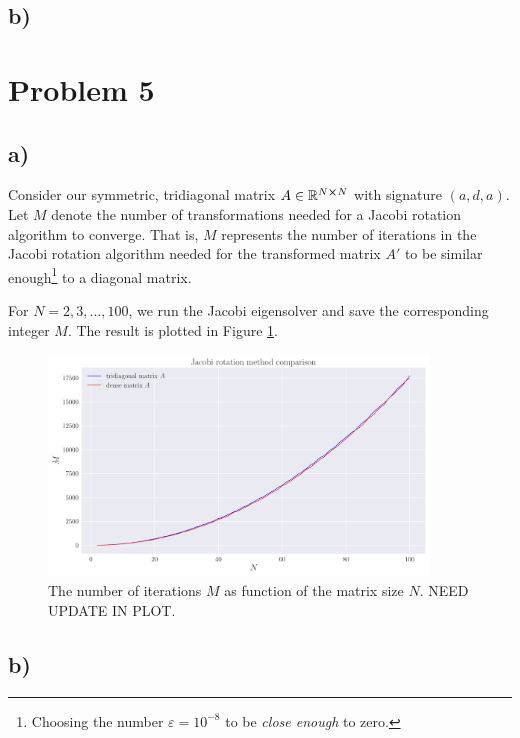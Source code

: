 \documentclass[english,notitlepage,nofootinbib]{revtex4-1}  %
\begin{document}
\subsection*{b)}



\section*{Problem 5}

\subsection*{a)}

Consider our symmetric, tridiagonal matrix $A \in \mathbb{R}^{N\cross N}$ with signature $(a,d,a)$. Let $M$ denote the number of transformations needed for a Jacobi rotation algorithm to converge. That is, $M$ represents the number of iterations in the Jacobi rotation algorithm needed for the transformed matrix $A'$ to be similar enough\footnote{Choosing the number $\varepsilon=10^{-8}$ to be \textit{close enough} to zero.} to a diagonal matrix.

For $N=2,3,\dots,100$, we run the Jacobi eigensolver and save the corresponding integer $M$. The result is plotted in Figure \ref{fig:p5_transformations_per_N}.


\begin{figure}[h!]
    \centering
    \includegraphics[width=0.9\textwidth]{jacobi_comparison.pdf}
    \caption{The number of iterations $M$ as function of the matrix size $N$. NEED UPDATE IN PLOT.}\label{fig:p5_transformations_per_N}
\end{figure}


\subsection*{b)}
\end{document}

